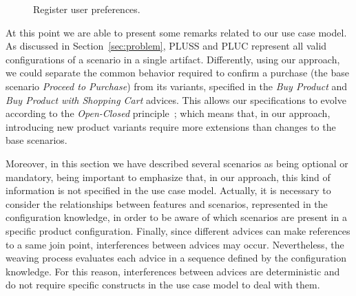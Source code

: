 \begin{figure}[h]
\caption{Register user preferences.}
\label{fig:register-preferences-flow}
\end{figure}

At this point we are able to present some remarks related to our use
case model. As discussed in Section~\ref{sec:problem}, PLUSS and PLUC represent
all valid configurations of a scenario in a single artifact. Differently, using
our approach, we could separate the common behavior required to confirm a
purchase (the base scenario \emph{Proceed to Purchase}) from its variants,
specified in the \emph{Buy Product} and \emph{Buy Product with Shopping Cart}
advices. This allows our specifications to evolve according to the
\emph{Open-Closed} principle~\cite{Meyer:2000aa}; which means that, in our
approach, introducing new product variants require more extensions than changes
to the base scenarios.

Moreover, in this section we have described several
scenarios as being optional or mandatory, being important to emphasize
that, in our approach, this kind of information is not specified in the use case
model. Actually, it is necessary to consider the relationships between features
and scenarios, represented in the configuration knowledge, in order to be aware
of which scenarios are present in a specific product configuration. Finally,
since different advices can make references to a same join point,  interferences
between advices may occur. Nevertheless, the weaving process evaluates each advice in
a sequence defined by the configuration knowledge. For this reason, interferences
between advices are deterministic and do not require specific constructs in the
use case model to deal with them.

